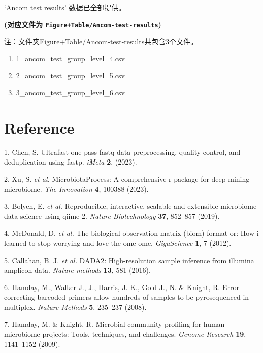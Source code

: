 \documentclass[
]{article}
\providecommand{\tightlist}{%
  \setlength{\itemsep}{0pt}\setlength{\parskip}{0pt}}
\newenvironment{cslreferences}%
  {}%
  {\par}
\begin{document}
`Ancom test results' 数据已全部提供。

\textbf{(对应文件为 \texttt{Figure+Table/Ancom-test-results})}

\begin{center}\begin{tcolorbox}[colback=gray!10, colframe=gray!50, width=0.9\linewidth, arc=1mm, boxrule=0.5pt]注：文件夹Figure+Table/Ancom-test-results共包含3个文件。

\begin{enumerate}\tightlist
\item 1\_ancom\_test\_group\_level\_4.csv
\item 2\_ancom\_test\_group\_level\_5.csv
\item 3\_ancom\_test\_group\_level\_6.csv
\end{enumerate}\end{tcolorbox}
\end{center}

\hypertarget{bibliography}{%
\section*{Reference}\label{bibliography}}

\hypertarget{refs}{}
\begin{cslreferences}
\leavevmode\hypertarget{ref-UltrafastOnePChen2023}{}%
1. Chen, S. Ultrafast one-pass fastq data preprocessing, quality control, and deduplication using fastp. \emph{iMeta} \textbf{2}, (2023).

\leavevmode\hypertarget{ref-MicrobiotaproceXuSh2023}{}%
2. Xu, S. \emph{et al.} MicrobiotaProcess: A comprehensive r package for deep mining microbiome. \emph{The Innovation} \textbf{4}, 100388 (2023).

\leavevmode\hypertarget{ref-ReproducibleIBolyen2019}{}%
3. Bolyen, E. \emph{et al.} Reproducible, interactive, scalable and extensible microbiome data science using qiime 2. \emph{Nature Biotechnology} \textbf{37}, 852--857 (2019).

\leavevmode\hypertarget{ref-TheBiologicalMcdona2012}{}%
4. McDonald, D. \emph{et al.} The biological observation matrix (biom) format or: How i learned to stop worrying and love the ome-ome. \emph{GigaScience} \textbf{1}, 7 (2012).

\leavevmode\hypertarget{ref-Dada2HighResCallah2016}{}%
5. Callahan, B. J. \emph{et al.} DADA2: High-resolution sample inference from illumina amplicon data. \emph{Nature methods} \textbf{13}, 581 (2016).

\leavevmode\hypertarget{ref-ErrorCorrectinHamday2008}{}%
6. Hamday, M., Walker J., J., Harris, J. K., Gold J., N. \& Knight, R. Error-correcting barcoded primers allow hundreds of samples to be pyrosequenced in multiplex. \emph{Nature Methods} \textbf{5}, 235--237 (2008).

\leavevmode\hypertarget{ref-MicrobialCommuHamday2009}{}%
7. Hamday, M. \& Knight, R. Microbial community profiling for human microbiome projects: Tools, techniques, and challenges. \emph{Genome Research} \textbf{19}, 1141--1152 (2009).
\end{cslreferences}
\end{document}
